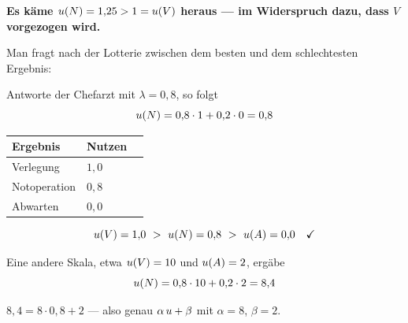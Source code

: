\begin{aufgabe}
\begin{center}
\begin{minipage}{0.9\textwidth}
\textbf{Es käme $u(N) = 1{,}25 > 1 = u(V)$ heraus --- im Widerspruch dazu, dass $V$ vorgezogen wird.}
\end{minipage}
\end{center}

\begin{center}
\begin{minipage}{0.88\textwidth}
\end{minipage}
\end{center}

Man fragt nach der Lotterie zwischen dem besten und dem schlechtesten Ergebnis:


Antworte der Chefarzt mit $\lambda = 0{,}8$, so folgt
\[ u(N) = 0{,}8\cdot1 + 0{,}2\cdot0 = 0{,}8 \]

\begin{center}
\renewcommand{\arraystretch}{1.48}
\begin{tabular}{@{}P{2.6cm}P{2.0cm}P{2.6cm}@{}}
\toprule
\textbf{Ergebnis} & \textbf{Nutzen} & \\
\midrule
Verlegung & $1{,}0$ & \\
Notoperation & $0{,}8$ & \\
Abwarten & $0{,}0$ & \\
\bottomrule
\end{tabular}
\end{center}

\[ u(V) = 1{,}0 \ >\ u(N) = 0{,}8 \ >\ u(A) = 0{,}0 \quad \checkmark \]

Eine andere Skala, etwa $u(V) = 10$ und $u(A) = 2$, ergäbe
\[ u(N) = 0{,}8\cdot10 + 0{,}2\cdot2 = 8{,}4 \]

 $8{,}4 = 8\cdot0{,}8 + 2$ --- also genau $\alpha\,u + \beta$ mit $\alpha=8$, $\beta=2$. \checkmark


\end{aufgabe}
